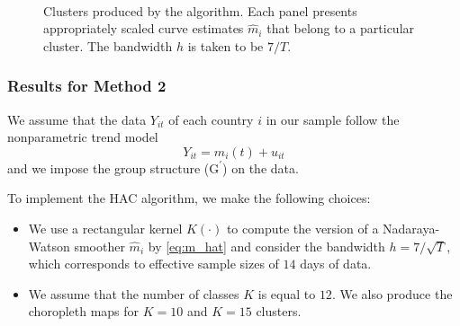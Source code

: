 \documentclass[a4paper,12pt]{article}
\numberwithin{equation}{section}
\begin{document}
\begin{figure}
\\
\hspace{0.25cm}
\caption{Clusters produced by the algorithm. Each panel presents appropriately scaled curve estimates $\hat{m}_i$ that belong to a particular cluster. The bandwidth $h$ is taken to be $7/T$.}\label{fig:clusters_14days}
\end{figure}

\subsubsection{Results for Method 2}

We assume that the data $Y_{it}$ of each country $i$ in our sample follow the nonparametric trend model 
\[ Y_{it} = m_i(t) + u_{it} \]
and we impose the group structure ($\text{G}^\prime$) on the data. 

To implement the HAC algorithm, we make the following choices:
\begin{itemize}[leftmargin=0.6cm]
\item We use a rectangular kernel $K(\cdot)$ to compute the version of a Nadaraya-Watson smoother $\hat{m}_{i}$ by \eqref{eq:m_hat} and consider the bandwidth $h = 7/\sqrt{T}$, which corresponds to effective sample sizes of $14$ days of data. 
\item We assume that the number of classes $K$ is equal to $12$. We also produce the choropleth maps for $K=10$ and $K = 15$ clusters.
\end{itemize}
\end{document}
